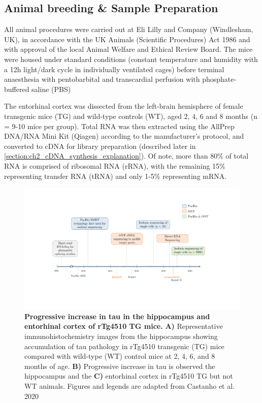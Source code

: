 \subsection{Animal breeding \& Sample Preparation}
\label{sec: animalbreeding_sample preparation}
All animal procedures were carried out at Eli Lilly and Company (Windlesham, UK), in accordance with the UK Animals (Scientific Procedures) Act 1986 and with approval of the local Animal Welfare and Ethical Review Board. The mice were housed under standard conditions (constant temperature and humidity with a 12h light/dark cycle in individually ventilated cages) before terminal anaesthesia with pentobarbital and transcardial perfusion with phosphate-buffered saline (PBS)\cite{Castanho2020}

The entorhinal cortex was dissected from the left-brain hemisphere of female transgenic mice (TG) and wild-type controls (WT), aged 2, 4, 6 and 8 months (n = 9-10 mice per group). Total RNA was then extracted\cite{Castanho2020} using the AllPrep DNA/RNA Mini Kit (Qiagen) according to the manufacturer's protocol, and converted to cDNA for library preparation (described later in \cref{section:ch2_cDNA_synthesis_explanation}). Of note, more than 80\% of total RNA is comprised of ribosomal RNA (rRNA), with the remaining 15\% representing transfer RNA (tRNA) and only 1-5\% representing mRNA. 

\begin{landscape}
	\begin{figure}[htp]
		\centering
		\vspace{20pt}
		\includegraphics[page=3,trim={0 7cm 0 0 },clip, scale = 0.7]{Figures/Introduction_Figures_Landscape.pdf}
		\captionsetup{width=1.5\textwidth}
		\caption[Progressive increase in tau in the hippocampus and entorhinal cortex of rTg4510 TG mice]%
		{\textbf{Progressive increase in tau in the hippocampus and entorhinal cortex of rTg4510 TG mice.} \textbf{A)} Representative immunohistochemistry images from the hippocampus showing accumulation of tau pathology in rTg4510 transgenic (TG) mice compared with wild-type (WT) control mice at 2, 4, 6, and 8 months of age. \textbf{B)} Progressive increase in tau is observed the hippocampus and the \textbf{C)} entorhinal cortex in rTg4510 TG but not WT animals. Figures and legends are adapted from Castanho et al. 2020 \cite{Castanho2020}}
		\label{fig:immunohistochemistry}
	\end{figure}	
\end{landscape}

